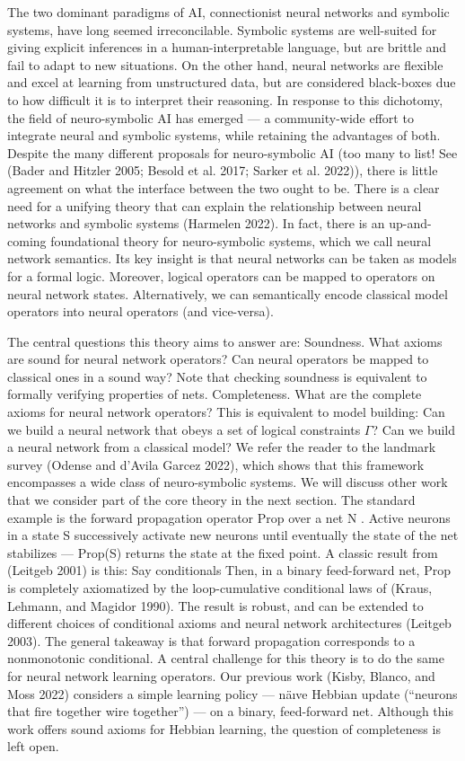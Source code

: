 \documentclass{article}
\begin{document}
The two dominant paradigms of AI, connectionist neural networks and symbolic
systems, have long seemed irreconcilable. Symbolic systems are well-suited for
giving explicit inferences in a human-interpretable language, but are brittle
and fail to adapt to new situations. On the other hand, neural networks are
flexible and excel at learning from unstructured data, but are considered
black-boxes due to how difficult it is to interpret their reasoning. In
response to this dichotomy, the field of neuro-symbolic AI has emerged --- a
community-wide effort to integrate neural and symbolic systems, while
retaining the advantages of both. Despite the many different proposals for
neuro-symbolic AI (too many to list! See (Bader and Hitzler 2005; Besold et
al. 2017; Sarker et al. 2022)), there is little agreement on what the
interface between the two ought to be. There is a clear need for a unifying
theory that can explain the relationship between neural networks and symbolic
systems (Harmelen 2022). In fact, there is an up-and-coming foundational
theory for neuro-symbolic systems, which we call neural network semantics. Its
key insight is that neural networks can be taken as models for a formal logic.
Moreover, logical operators can be mapped to operators on neural network
states. Alternatively, we can semantically encode classical model operators
into neural operators (and vice-versa).

The central questions this theory aims to answer are: Soundness. What axioms
are sound for neural network operators? Can neural operators be mapped to
classical ones in a sound way? Note that checking soundness is equivalent to
formally verifying properties of nets. Completeness. What are the complete
axioms for neural network operators? This is equivalent to model building: Can
we build a neural network that obeys a set of logical constraints $\Gamma$?
Can we build a neural network from a classical model? We refer the reader to
the landmark survey (Odense and d'Avila Garcez 2022), which shows that this
framework encompasses a wide class of neuro-symbolic systems. We will discuss
other work that we consider part of the core theory in the next section. The
standard example is the forward propagation operator Prop over a net N .
Active neurons in a state S successively activate new neurons until eventually
the state of the net stabilizes --- Prop(S) returns the state at the fixed
point. A classic result from (Leitgeb 2001) is this: Say conditionals Then, in
a binary feed-forward net, Prop is completely axiomatized by the
loop-cumulative conditional laws of (Kraus, Lehmann, and Magidor 1990). The
result is robust, and can be extended to different choices of conditional
axioms and neural network architectures (Leitgeb 2003). The general takeaway
is that forward propagation corresponds to a nonmonotonic conditional. A
central challenge for this theory is to do the same for neural network
learning operators. Our previous work (Kisby, Blanco, and Moss 2022) considers
a simple learning policy --- na\"{}{\i}ve Hebbian update (``neurons that fire
together wire together'') --- on a binary, feed-forward net. Although this
work offers sound axioms for Hebbian learning, the question of completeness is
left open.
\end{document}
